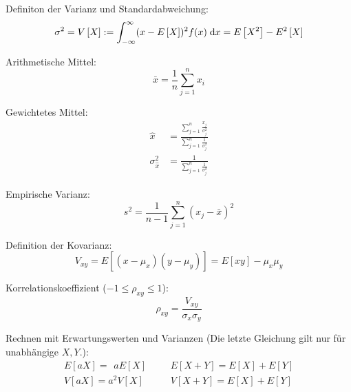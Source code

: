 \documentclass[11pt]{article}
\numberwithin{equation}{section}
\begin{document}
				\noindent
				Definiton der Varianz und Standardabweichung:
				\begin{equation}
					\sigma^2 = V\left[ X \right] := \int_{-\infty}^{\infty} (x-E\left[X\right])^2f(x)\;\mathrm{d} x = E\left[X^2\right]-E^2\left[X\right]
				\end{equation}

				\noindent
				Arithmetische Mittel:
				\begin{equation}
					\bar{x}=\frac{1}{n}\sum_{j=1}^n x_i
				\end{equation}

				\noindent
				Gewichtetes Mittel:
				\begin{equation}
					\begin{aligned}
						\hat{x} &= \frac{\sum_{j=1}^n \frac{x_j}{\sigma_j^2}}{\sum_{j=1}^n \frac{1}{\sigma_j^2}} \\
						\sigma_{\hat{x}}^2 &= \frac{1}{\sum_{j=1}^n \frac{1}{\sigma_j^2}}
					\end{aligned}
				\end{equation}

				\noindent
				Empirische Varianz:
				\begin{equation}
					s^2 = \frac{1}{n-1}\sum_{j=1}^n (x_j-\bar{x})^2
				\end{equation}

				\noindent
				Definition der Kovarianz:
				\begin{equation}
					V_{xy} = E\left[(x-\mu_x)(y-\mu_y)\right] = E\left[xy\right]-\mu_x\mu_y
				\end{equation}

				\noindent
				Korrelationskoeffizient ($-1\le\rho_{xy}\le 1$):
				\begin{equation}
					\rho_{xy} = \frac{V_{xy}}{\sigma_x\sigma_y}
				\end{equation}

				\noindent
				Rechnen mit Erwartungswerten und Varianzen (Die letzte Gleichung gilt nur für unabhängige $X, Y$.):
				\begin{equation}
					\begin{array}{rl}
						E\left[aX\right] = \phantom{^2}a E\left[X\right]
						&\hspace{20pt}
						E\left[X+Y\right] = E\left[X\right] + E\left[Y\right]
						\\
						V\left[aX\right] = a^2 V\left[X\right]
						&\hspace{20pt}
						V\left[X+Y\right] = E\left[X\right] + E\left[Y\right]
						\\
					\end{array}
				\end{equation}
\end{document}

